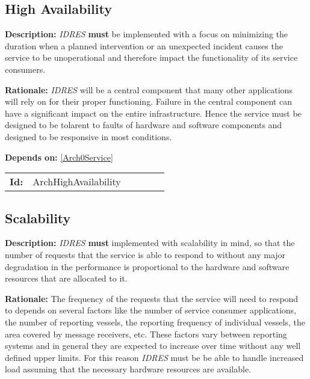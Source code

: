 \subsection{High Availability}\label{ArchHighAvailability}
\textbf{Description:} \textsl{IDRES} \textbf{must} be implemented with a focus on minimizing the duration when a planned intervention or an unexpected  incident causes the service to be unoperational and therefore impact  the functionality of its service consumers.

\textbf{Rationale:} \textsl{IDRES} will be a central component that many other  applications will rely on for their proper functioning. Failure in the  central component can have a significant impact on the entire infrastructure. Hence the service must be designed to be tolarent to faults of hardware  and software components and designed to be responsive in most conditions.

\textbf{Depends on:} \ref{Arch0Service} 

\par
{\small \begin{center}\begin{tabular}{rlrlrl}
\textbf{Id:} & ArchHighAvailability  & & & \end{tabular}\end{center} }

\subsection{Scalability}\label{ArchScalability}
\textbf{Description:} \textsl{IDRES} \textbf{must} implemented with scalability  in mind, so that the number of requests that the service is able  to respond to without any major degradation in the performance is  proportional to the hardware and software resources  that are allocated to it.

\textbf{Rationale:} The frequency of the requests that the service will need to respond  to depends on several factors like the number of service consumer applications, the number of reporting vessels, the reporting frequency of individual vessels, the area covered by message receivers, etc. These factors vary between reporting systems and in general  they are expected to increase over time without any well defined upper limits.  For this reason \textsl{IDRES} must be be able to handle increased load  assuming that the necessary hardware resources are available.

